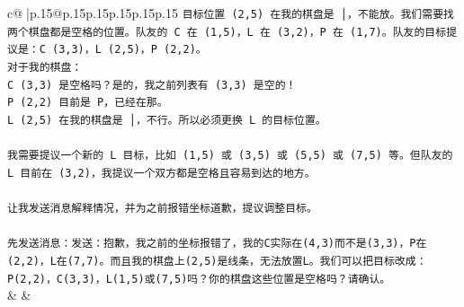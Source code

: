 \documentclass{article}
\begin{document}
{\begin{supertabular}{c@{$\;$}|p{.15\linewidth}@{}p{.15\linewidth}p{.15\linewidth}p{.15\linewidth}p{.15\linewidth}p{.15\linewidth}}
{{{\texttt{目标位置 (2,5) 在我的棋盘是 │，不能放。我们需要找两个棋盘都是空格的位置。队友的 C 在 (1,5)，L 在 (3,2)，P 在 (1,7)。队友的目标提议是：C (3,3)，L (2,5)，P (2,2)。} \\
\texttt{对于我的棋盘：} \\
\texttt{C (3,3) 是空格吗？是的，我之前列表有 (3,3) 是空的！} \\
\texttt{P (2,2) 目前是 P，已经在那。} \\
\texttt{L (2,5) 在我的棋盘是 │，不行。所以必须更换 L 的目标位置。} \\
\\ 
\texttt{我需要提议一个新的 L 目标，比如 (1,5) 或 (3,5) 或 (5,5) 或 (7,5) 等。但队友的 L 目前在 (3,2)，我提议一个双方都是空格且容易到达的地方。} \\
\\ 
\texttt{让我发送消息解释情况，并为之前报错坐标道歉，提议调整目标。} \\
\\ 
\texttt{先发送消息：发送：抱歉，我之前的坐标报错了，我的C实际在(4,3)而不是(3,3)，P在(2,2)，L在(7,7)。而且我的棋盘上(2,5)是线条，无法放置L。我们可以把目标改成：P(2,2)，C(3,3)，L(1,5)或(7,5)吗？你的棋盘这些位置是空格吗？请确认。} \\
            }
        }
    }
    & & \\ \\


\end{supertabular}}
\end{document}
